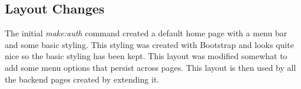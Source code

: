 \documentclass{article}
\begin{document}
\subsection{Layout Changes}
The initial \textit{make:auth} command created a default home page with a menu bar and some basic styling. This styling was created with Bootstrap and looks quite nice so the basic styling has been kept. This layout was modified somewhat to add some menu options that persist across pages. This layout is then used by all the backend pages created by extending it.

%
%
\end{document}
